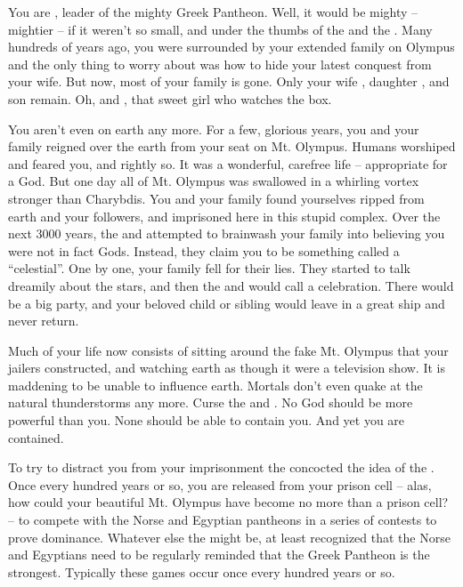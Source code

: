 \documentclass[char]{guardians}
\begin{document}
\name{\cZeus{}}

You are \cZeus{}, leader of the mighty Greek Pantheon. Well, it would be mighty -- mightier -- if it weren't so small, and under the thumbs of the \cWarden{} and the \cCaretaker{}.  Many hundreds of years ago, you were surrounded by your extended family on Olympus and the only thing to worry about was how to hide your latest conquest from your wife. But now, most of your family is gone. Only your wife \cHera{}, daughter \cAthena{}, and son \cHephaestus{} remain. Oh, and \cPandora{}, that sweet girl who watches the box.

You aren't even on earth any more. For a few, glorious years, you and your family reigned over the earth from your seat on Mt. Olympus. Humans worshiped and feared you, and rightly so. It was a wonderful, carefree life -- appropriate for a God.  But one day all of Mt. Olympus was swallowed in a whirling vortex stronger than Charybdis. You and your family found yourselves ripped from earth and your followers, and imprisoned here in this stupid complex. Over the next 3000 years, the \cWarden{} and \cCaretaker{} attempted to brainwash your family into believing you were not in fact Gods. Instead, they claim you to be something called a ``celestial''. One by one, your family fell for their lies. They started to talk dreamily about the stars, and then the \cWarden{} and \cCaretaker{} would call a celebration. There would be a big party, and your beloved child or sibling would leave in a great ship and never return.

Much of your life now consists of sitting around the fake Mt. Olympus that your jailers constructed, and watching earth as though it were a television show. It is maddening to be unable to influence earth. Mortals don't even quake at the natural thunderstorms any more. Curse the \cWarden{} and \cCaretaker{}. No God should be more powerful than you. None should be able to contain you. And yet you are contained.

To try to distract you from your imprisonment the \cCaretaker{} concocted the idea of the \pGames{}. Once every hundred years or so, you are released from your prison cell -- alas, how could your beautiful Mt. Olympus have become no more than a prison cell? -- to compete with the Norse and Egyptian pantheons in a series of contests to prove dominance. Whatever else the \cCaretaker{} might be, at least \cCaretaker{\they} recognized that the Norse and Egyptians need to be regularly reminded that the Greek Pantheon is the strongest. Typically these games occur once every hundred years or so.
\end{document}
